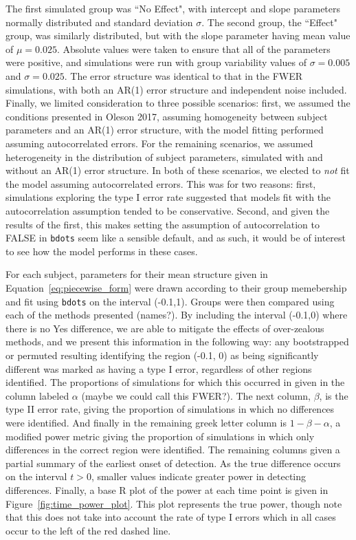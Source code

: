 \documentclass{article}
\newcommand{\xt}{\texttt}
\begin{document}
The first simulated group was ``No Effect", with intercept and slope parameters normally distributed and standard deviation $\sigma$. The second group, the ``Effect" group, was similarly distributed, but with the slope parameter having mean value of $\mu = 0.025$. Absolute values were taken to ensure that all of the parameters were positive, and simulations were run with group variability values of $\sigma = 0.005$ and $\sigma = 0.025$. The error structure was identical to that in the FWER simulations, with both an AR(1) error structure and independent noise included. Finally, we limited consideration to three possible scenarios: first, we assumed the conditions presented in Oleson 2017, assuming homogeneity between subject parameters and an AR(1) error structure, with the model fitting performed assuming autocorrelated errors. For the remaining scenarios, we assumed heterogeneity in the distribution of subject parameters, simulated with and without an AR(1) error structure. In both of these scenarios, we elected to \textit{not} fit the model assuming autocorrelated errors. This was for two reasons: first, simulations exploring the type I error rate suggested that models fit with the autocorrelation assumption tended to be conservative. Second, and given the results of the first, this makes setting the assumption of autocorrelation to FALSE in \xt{bdots} seem like a sensible default, and as such, it would be of interest to see how the model performs in these cases.

For each subject, parameters for their mean structure given in Equation~\ref{eq:piecewise_form} were drawn according to their group memebership and fit using \xt{bdots} on the interval (-0.1,1). Groups were then compared using each of the methods presented (names?). By including the interval (-0.1,0) where there is no Yes difference, we are able to mitigate the effects of over-zealous methods, and we present this information in the following way: any bootstrapped or permuted resulting identifying the region (-0.1, 0) as being significantly different was marked as having a type I error, regardless of other regions identified. The proportions of simulations for which this occurred in given in the column labeled $\alpha$ (maybe we could call this FWER?). The next column, $\beta$, is the type II error rate, giving the proportion of simulations in which no differences were identified. And finally in the remaining greek letter column is   $1-\beta-\alpha$, a modified power metric giving the proportion of simulations in which only differences in the correct region were identified. The remaining columns given a partial summary of the earliest onset of detection. As the true difference occurs on the interval $t > 0$, smaller values indicate greater power in detecting differences. Finally, a base R plot of the power at each time point is given in Figure~\ref{fig:time_power_plot}. This plot represents the true power, though note that this does not take into account the rate of type I errors which in all cases occur to the left of the red dashed line.
\end{document}
